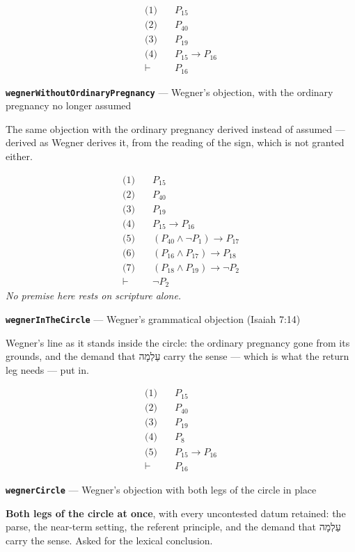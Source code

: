 \documentclass[11pt]{article}
\begin{document}
\begin{align*}
  \text{(1)} \quad & P_{15} \\
  \text{(2)} \quad & P_{40} \\
  \text{(3)} \quad & P_{19} \\
  \text{(4)} \quad & P_{15} \rightarrow P_{16} \\
  \vdash \quad & P_{16}
\end{align*}
\par\medskip\noindent\textbf{\texttt{wegner\allowbreak{}Without\allowbreak{}Ordinary\allowbreak{}Pregnancy}} --- Wegner's objection, with the ordinary pregnancy no longer assumed\par\nobreak\noindent
The same objection with the ordinary pregnancy derived instead of assumed — derived as Wegner derives it, from the reading of the sign, which is not granted either.

\begin{align*}
  \text{(1)} \quad & P_{15} \\
  \text{(2)} \quad & P_{40} \\
  \text{(3)} \quad & P_{19} \\
  \text{(4)} \quad & P_{15} \rightarrow P_{16} \\
  \text{(5)} \quad & (P_{40} \land \lnot P_{1}) \rightarrow P_{17} \\
  \text{(6)} \quad & (P_{16} \land P_{17}) \rightarrow P_{18} \\
  \text{(7)} \quad & (P_{18} \land P_{19}) \rightarrow \lnot P_{2} \\
  \vdash \quad & \lnot P_{2}
\end{align*}
\emph{No premise here rests on scripture alone.}
\par\medskip\noindent\textbf{\texttt{wegner\allowbreak{}In\allowbreak{}The\allowbreak{}Circle}} --- Wegner's grammatical objection (Isaiah 7:14)\par\nobreak\noindent
Wegner's line as it stands inside the circle: the ordinary pregnancy gone from its grounds, and the demand that עַלְמָה carry the sense — which is what the return leg needs — put in.

\begin{align*}
  \text{(1)} \quad & P_{15} \\
  \text{(2)} \quad & P_{40} \\
  \text{(3)} \quad & P_{19} \\
  \text{(4)} \quad & P_{8} \\
  \text{(5)} \quad & P_{15} \rightarrow P_{16} \\
  \vdash \quad & P_{16}
\end{align*}
\par\medskip\noindent\textbf{\texttt{wegner\allowbreak{}Circle}} --- Wegner's objection with both legs of the circle in place\par\nobreak\noindent
\textbf{Both legs of the circle at once}, with every uncontested datum retained: the parse, the near-term setting, the referent principle, and the demand that עַלְמָה carry the sense. Asked for the lexical conclusion.
\end{document}
